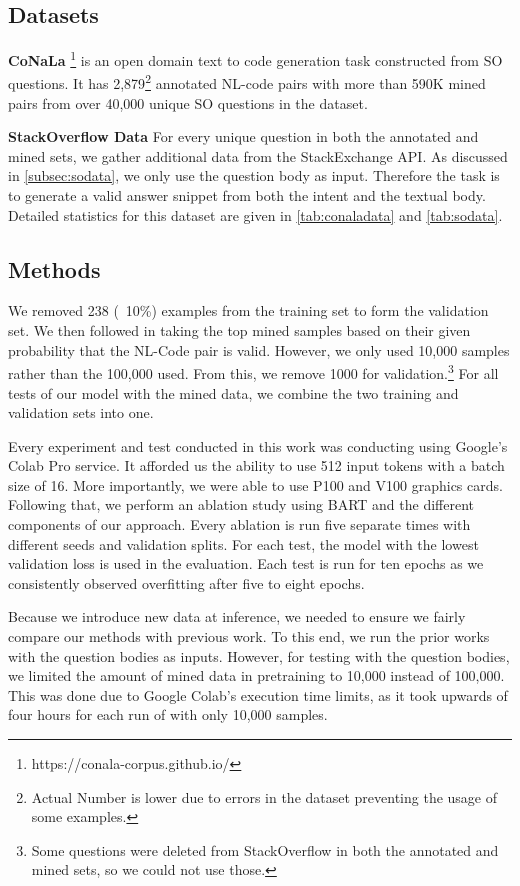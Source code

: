\documentclass[11pt]{article}
\begin{document}
\subsection{Datasets}
\textbf{CoNaLa} \citep{yin2018learning}\footnote{https://conala-corpus.github.io/} is an open domain text to code generation task constructed from SO questions. It has 2,879\footnote{Actual Number is lower due to errors in the dataset preventing the usage of some examples.} annotated NL-code pairs with more than 590K mined pairs from over 40,000 unique SO questions in the dataset. 

\noindent\textbf{StackOverflow Data} For every unique question in both the annotated and mined sets, we gather additional data from the StackExchange API. As discussed in \autoref{subsec:sodata}, we only use the question body as input. Therefore the task is to generate a valid answer snippet from both the intent and the textual body. Detailed statistics for this dataset are given in \autoref{tab:conaladata} and \autoref{tab:sodata}.

\subsection{Methods}\label{subsec:methods}
We removed 238 (~10\%) examples from the training set to form the validation set. We then followed \citet{xu-etal-2020-incorporating} in taking the top mined samples based on their given probability that the NL-Code pair is valid. However, we only used 10,000 samples rather than the 100,000 \citet{xu-etal-2020-incorporating} used. From this, we remove 1000 for validation.\footnote{Some questions were deleted from StackOverflow in both the annotated and mined sets, so we could not use those.} For all tests of our model with the mined data, we combine the two training and validation sets into one. 

\indent Every experiment and test conducted in this work was conducting using Google's Colab Pro service. It afforded us the ability to use 512 input tokens with a batch size of 16. More importantly, we were able to use P100 and V100 graphics cards. Following that, we perform an ablation study using BART and the different components of our approach. Every ablation is run five separate times with different seeds and validation splits. For each test, the model with the lowest validation loss is used in the evaluation. Each test is run for ten epochs as we consistently observed overfitting after five to eight epochs.

\indent Because we introduce new data at inference, we needed to ensure we fairly compare our methods with previous work. To this end, we run the prior works with the question bodies as inputs. However, for testing \citet{xu-etal-2020-incorporating} with the question bodies, we limited the amount of mined data in pretraining to 10,000 instead of 100,000. This was done due to Google Colab's execution time limits, as it took upwards of four hours for each run of \citet{xu-etal-2020-incorporating} with only 10,000 samples. 
\end{document}
